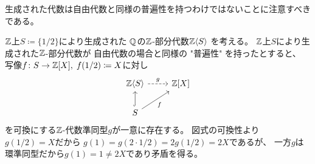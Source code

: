 \documentclass[report]{jlreq}
\begin{document}
%
%

生成された代数は自由代数と同様の普遍性を持つわけではないことに注意すべきである。

\begin{remark}
    $\mathbb{Z}$上$S \coloneqq \{ 1/2 \}$により生成された
    $\mathbb{Q}$の$\mathbb{Z}$-部分代数$\mathbb{Z}\langle S \rangle$
    を考える。
    $\mathbb{Z}$上$S$により生成された$\mathbb{Z}$-部分代数が
    自由代数の場合と同様の "普遍性" を持ったとすると、
    写像$f \colon S \to \mathbb{Z}[X], \; f(1/2) \coloneqq X$に対し
    \begin{equation}
        \begin{tikzcd}
            \Z\langle S \rangle
                \ar[dashed]{r}{g}
                & \Z[X] \\
            S
                \ar[hook]{u}
                \ar{ru}[swap]{f}
        \end{tikzcd}
    \end{equation}
    を可換にする$\mathbb{Z}$-代数準同型$g$が一意に存在する。
    図式の可換性より
    $g(1/2) = X$だから
    $g(1) = g(2 \cdot 1/2) = 2g(1/2) = 2X$であるが、
    一方$g$は環準同型だから$g(1) = 1 \neq 2X$であり矛盾を得る。
\end{remark}
\end{document}
